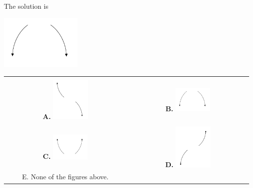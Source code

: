 \documentclass{extbook}[14pt]
\begin{document}
 
 The solution is  
 \begin{center} \includegraphics[width=0.3\textwidth]{../Figures/polyEndBehaviorBA.png} \end{center}\begin{tabular}{|c|c|} 
\hline 
 & \tabularnewline 
 \textbf{A.} \includegraphics[width=0.3\textwidth]{../Figures/polyEndBehaviorAA.png} & \textbf{B.} \includegraphics[width=0.3\textwidth]{../Figures/polyEndBehaviorBA.png} \tabularnewline 
\hline 
 & \tabularnewline 
 \textbf{C.} \includegraphics[width=0.3\textwidth]{../Figures/polyEndBehaviorCA.png} & \textbf{D.} \includegraphics[width=0.3\textwidth]{../Figures/polyEndBehaviorDA.png} \tabularnewline 
\hline 
 E. None of the figures above. & \tabularnewline 
\hline 
 \end{tabular} 
 
\end{document}
